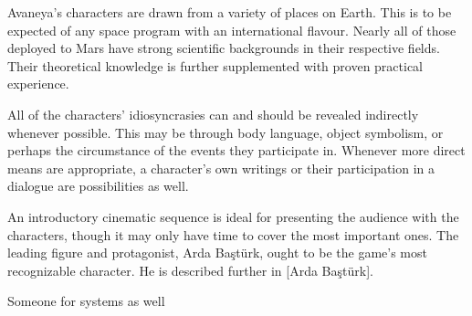 

Avaneya's characters are drawn from a variety of places on Earth. This is to be expected of any space program with an international flavour. Nearly all of those deployed to Mars have strong scientific backgrounds in their respective fields. Their theoretical knowledge is further supplemented with proven practical experience.

All of the characters' idiosyncrasies can and should be revealed indirectly whenever possible. This may be through body language, object symbolism, or perhaps the circumstance of the events they participate in. Whenever more direct means are appropriate, a character's own writings or their participation in a dialogue are possibilities as well.

An introductory cinematic sequence is ideal for presenting the audience with the characters, though it may only have time to cover the most important ones. The leading figure and protagonist, Arda Baştürk, ought to be the game's most recognizable character. He is described further in [Arda Baştürk].





Someone for systems as well

\StopChapter

